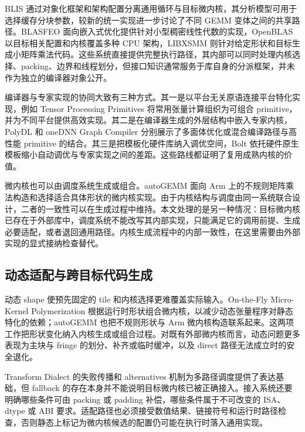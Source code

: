 BLIS 通过对象化框架和架构配置分离通用循环与目标微内核\cite{VanZee2015BLIS,VanZee2016BLISFramework}，其分析模型可用于选择缓存分块参数\cite{Low2017AnalyticalBLIS}，较新的统一实现进一步讨论了不同 GEMM 变体之间的共享路径\cite{Xu2023UnifiedGEMM}。BLASFEO 面向嵌入式优化提供针对小型稠密线性代数的实现\cite{Frison2018BLASFEO}，OpenBLAS 以目标相关配置和内核覆盖多种 CPU 架构\cite{OpenMathLibOpenBLAS}，LIBXSMM 则针对给定形状和目标生成小矩阵乘法代码\cite{Heinecke2016LIBXSMM}。这些系统直接提供完整执行路径，其内部可以同时处理内核选择、packing、边界和线程划分，但接口知识通常服务于库自身的分派框架，并未作为独立的编译器对象公开。

编译器与专家实现的协同大致有三种方式。其一是以平台无关原语连接平台特化实现，例如 Tensor Processing Primitives 将常用张量计算组织为可组合 primitive，并为不同平台提供高效实现\cite{Georganas2021TPP}。其二是在编译器生成的外层结构中嵌入专家内核，PolyDL 和 oneDNN Graph Compiler 分别展示了多面体优化或混合编译路径与高性能 primitive 的结合\cite{Tavarageri2021PolyDL,Li2024OneDNNGraphCompiler}。其三是把模板化硬件库纳入调优空间，Bolt 依托硬件原生模板缩小自动调优与专家实现之间的差距\cite{Xing2022Bolt}。这些路线都证明了复用成熟内核的价值。

微内核也可以由调度系统生成或组合。autoGEMM 面向 Arm 上的不规则矩阵乘法构造和选择适合具体形状的微内核实现\cite{Wu2024AutoGEMM}。由于内核结构与调度由同一系统联合设计，二者的一致性可以在生成过程中维持。本文处理的是另一种情况：目标微内核已存在于外部库中，调度系统不能改写其内部实现，只能满足它的调用前提、生成必要适配，或者退回通用路径。内核生成流程中的内部一致性，在这里需要由外部实现的显式接纳检查替代。

\subsection{动态适配与跨目标代码生成}

动态 shape 使预先固定的 tile 和内核选择更难覆盖实际输入。On-the-Fly Micro-Kernel Polymerization 根据运行时形状组合微内核，以减少动态张量程序对静态特化的依赖\cite{Yu2024MicroKernelPolymerization}；autoGEMM 也把不规则形状与 Arm 微内核构造联系起来\cite{Wu2024AutoGEMM}。这两项工作把形状变化纳入内核生成或组合过程。对既有外部微内核而言，动态问题更多表现为主块与 fringe 的划分、补齐或临时缓冲，以及 direct 路径无法成立时的安全退化。

Transform Dialect 的失败传播和 alternatives 机制为多路径调度提供了表达基础\cite{Luecke2025TransformDialect}，但 fallback 的存在本身并不能说明目标微内核已被正确接入。接入系统还要明确哪些条件可由 packing 或 padding 补偿，哪些条件属于不可改变的 ISA、dtype 或 ABI 要求。适配路径也必须接受数值结果、链接符号和运行时路径检查，否则静态上标记为微内核候选的配置仍可能在执行时落入通用实现。

